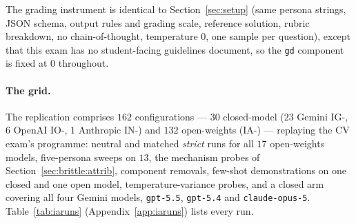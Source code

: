 The grading instrument is identical to Section~\ref{sec:setup} (same persona strings, JSON schema, output rules and grading scale, reference solution, rubric breakdown, no chain-of-thought, temperature $0$, one sample per question), except that this exam has no student-facing guidelines document, so the \texttt{gd} component is fixed at $0$ throughout.

\paragraph{The grid.}
The replication comprises $162$ configurations --- $30$ closed-model ($23$ Gemini IG-, $6$ OpenAI IO-, $1$ Anthropic IN-) and $132$ open-weights (IA-) --- replaying the CV exam's programme: neutral and matched \emph{strict} runs for all $17$ open-weights models, five-persona sweeps on $13$, the mechanism probes of Section~\ref{sec:brittle:attrib}, component removals, few-shot demonstrations on one closed and one open model, temperature-variance probes, and a closed arm covering all four Gemini models, \texttt{gpt-5.5}, \texttt{gpt-5.4} and \texttt{claude-opus-5}. Table~\ref{tab:iaruns} (Appendix~\ref{app:iaruns}) lists every run.

